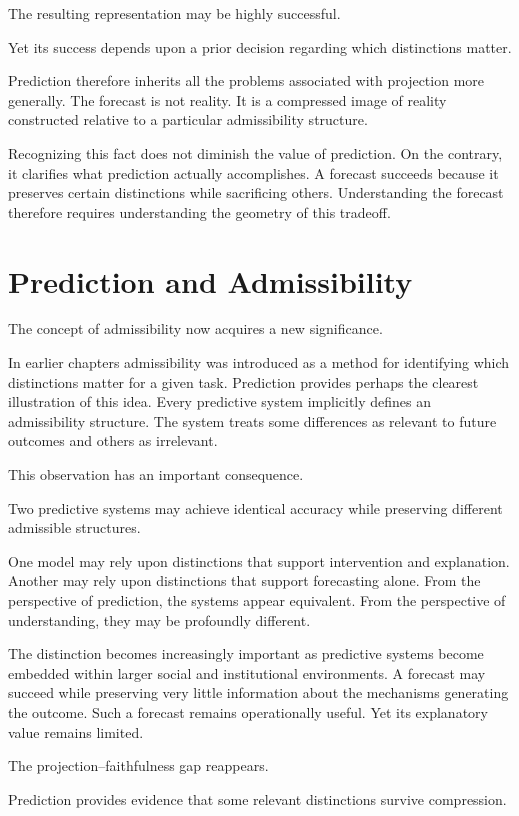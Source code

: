\documentclass[11pt,oneside,openany]{book}
\begin{document}
The resulting representation may be highly successful.

Yet its success depends upon a prior decision regarding which distinctions matter.

Prediction therefore inherits all the problems associated with projection more generally. The forecast is not reality. It is a compressed image of reality constructed relative to a particular admissibility structure.

Recognizing this fact does not diminish the value of prediction. On the contrary, it clarifies what prediction actually accomplishes. A forecast succeeds because it preserves certain distinctions while sacrificing others. Understanding the forecast therefore requires understanding the geometry of this tradeoff.

\section{Prediction and Admissibility}

The concept of admissibility now acquires a new significance.

In earlier chapters admissibility was introduced as a method for identifying which distinctions matter for a given task. Prediction provides perhaps the clearest illustration of this idea. Every predictive system implicitly defines an admissibility structure. The system treats some differences as relevant to future outcomes and others as irrelevant.

This observation has an important consequence.

Two predictive systems may achieve identical accuracy while preserving different admissible structures.

One model may rely upon distinctions that support intervention and explanation. Another may rely upon distinctions that support forecasting alone. From the perspective of prediction, the systems appear equivalent. From the perspective of understanding, they may be profoundly different.

The distinction becomes increasingly important as predictive systems become embedded within larger social and institutional environments. A forecast may succeed while preserving very little information about the mechanisms generating the outcome. Such a forecast remains operationally useful. Yet its explanatory value remains limited.

The projection--faithfulness gap reappears.

Prediction provides evidence that some relevant distinctions survive compression.
\end{document}
